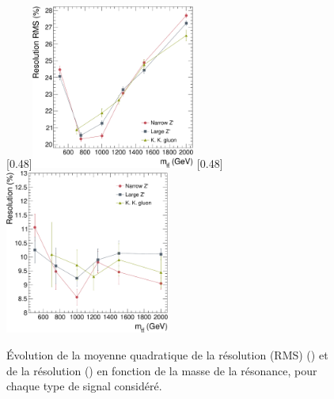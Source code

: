 \begin{figure}[tbp] \centering
    \subcaptionbox{\label{fig:rms_zprime}}[0.48\textwidth]{\includegraphics[width=0.48\textwidth]{chapitre7/figs/signal_rms_vs_mtt.pdf}} \hfill
    \subcaptionbox{\label{fig:reso_zprime}}[0.48\textwidth]{\includegraphics[width=0.48\textwidth]{chapitre7/figs/signal_reso_vs_mtt.pdf}}
    \caption{Évolution de la moyenne quadratique de la résolution (RMS) () et de la résolution () en fonction de la masse de la résonance, pour chaque type de signal considéré.}
    \label{fig:rms_reso_zprime}
\end{figure}

